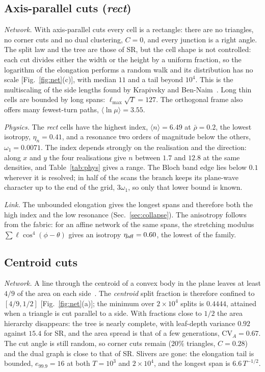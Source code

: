 \documentclass[aps,pre,twocolumn,superscriptaddress,amsmath,amssymb,floatfix]{revtex4-2}
\begin{document}
\subsection{Axis-parallel cuts (\emph{rect})}
\emph{Network.} With axis-parallel cuts every cell is a rectangle: there are no
triangles, no corner cuts and no dual clustering, $C=0$, and every junction is a right
angle. The split law and the tree are those of SR, but the cell shape is not controlled:
each cut divides either the width or the height by a uniform fraction, so the logarithm
of the elongation performs a random walk and its distribution has no scale [Fig.~\ref{fig:net}(c)], with median $11$ and a tail beyond
$10^4$. This is the multiscaling of the side lengths found by Krapivsky and
Ben-Naim~\cite{krapivsky1994}. Long thin cells are bounded by long spans:
$\ell_{\max}\sqrt T=127$. The orthogonal frame also offers many fewest-turn paths,
$\langle\ln\mu\rangle=3.55$.

\emph{Physics.} The \emph{rect} cells have the highest index, $\langle n\rangle=6.49$ at
$\bar\rho=0.2$, the lowest isotropy, $\eta_n=0.41$, and a resonance two orders of
magnitude below the others, $\omega_1=0.0071$. The index depends strongly on the
realisation and the direction: along $x$ and $y$ the four realisations give $n$ between
$1.7$ and $12.8$ at the same densities, and Table~\ref{tab:phys} gives a
range. The Bloch band edge lies below $0.1$ wherever it is resolved; in half of the scans the
branch keeps its plane-wave character up to the end of the grid, $3\omega_1$, so only that
lower bound is known.

\emph{Link.} The unbounded elongation gives the longest spans and therefore both the
high index and the low resonance (Sec.~\ref{sec:collapse}). The anisotropy follows from the
fabric: for an affine network of the same spans, the stretching modulus
$\sum\ell\cos^4(\phi-\theta)$ gives an isotropy $\eta_{\rm aff}=0.60$, the lowest of the
family.

\subsection{Centroid cuts}
\emph{Network.} A line through the centroid of a convex body in the plane leaves at least
$4/9$ of the area on each side~\cite{grunbaum1960}. The \emph{centroid} split fraction is
therefore confined to $[4/9,1/2]$ [Fig.~\ref{fig:net}(a)]; the minimum over $2\times10^4$
splits is $0.4444$, attained when a triangle is cut parallel to a side. With fractions
close to $1/2$ the area hierarchy disappears: the tree is nearly complete, with leaf-depth
variance $0.92$ against $15.4$ for SR, and the area spread is that of a few
generations, $\mathrm{CV}_A=0.67$. The cut angle is still random, so corner cuts remain
($20\%$ triangles, $C=0.28$) and the dual graph is close to that of SR. Slivers are gone:
the elongation tail is bounded, $e_{99.9}=16$ at both $T=10^3$ and $2\times10^4$, and the
longest span is $6.6\,T^{-1/2}$.
\end{document}
